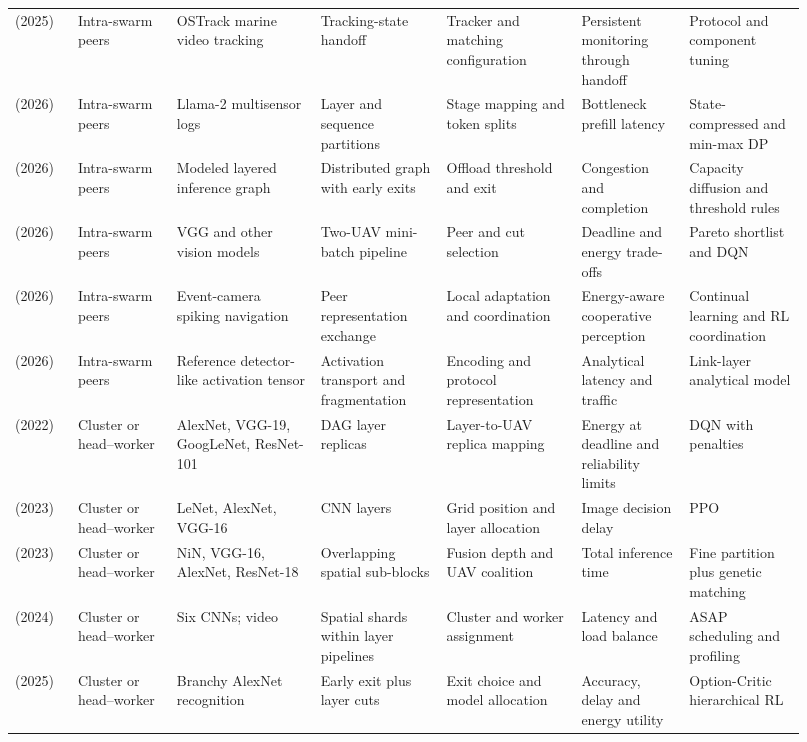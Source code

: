 \begin{longtable}{@{}Y{0.075\linewidth}Y{0.111\linewidth}Y{0.169\linewidth}Y{0.145\linewidth}Y{0.151\linewidth}Y{0.125\linewidth}Y{0.139\linewidth}@{}}
\cite{R0292} (2025) & Intra-swarm peers & OSTrack marine video tracking & Tracking-state handoff & Tracker and matching configuration & Persistent monitoring through handoff & Protocol and component tuning \\
\cite{R0074} (2026) & Intra-swarm peers & Llama-2 multisensor logs & Layer and sequence partitions & Stage mapping and token splits & Bottleneck prefill latency & State-compressed and min-max DP \\
\cite{R0077} (2026) & Intra-swarm peers & Modeled layered inference graph & Distributed graph with early exits & Offload threshold and exit & Congestion and completion & Capacity diffusion and threshold rules \\
\cite{R0092} (2026) & Intra-swarm peers & VGG and other vision models & Two-UAV mini-batch pipeline & Peer and cut selection & Deadline and energy trade-offs & Pareto shortlist and DQN \\
\cite{R0113} (2026) & Intra-swarm peers & Event-camera spiking navigation & Peer representation exchange & Local adaptation and coordination & Energy-aware cooperative perception & Continual learning and RL coordination \\
\cite{R0121} (2026) & Intra-swarm peers & Reference detector-like activation tensor & Activation transport and fragmentation & Encoding and protocol representation & Analytical latency and traffic & Link-layer analytical model \\
\cite{R0029} (2022) & Cluster or head--worker & AlexNet, VGG-19, GoogLeNet, ResNet-101 & DAG layer replicas & Layer-to-UAV replica mapping & Energy at deadline and reliability limits & DQN with penalties \\
\cite{R0019} (2023) & Cluster or head--worker & LeNet, AlexNet, VGG-16 & CNN layers & Grid position and layer allocation & Image decision delay & PPO \\
\cite{R0043} (2023) & Cluster or head--worker & NiN, VGG-16, AlexNet, ResNet-18 & Overlapping spatial sub-blocks & Fusion depth and UAV coalition & Total inference time & Fine partition plus genetic matching \\
\cite{R0014} (2024) & Cluster or head--worker & Six CNNs; video & Spatial shards within layer pipelines & Cluster and worker assignment & Latency and load balance & ASAP scheduling and profiling \\
\cite{R0022} (2025) & Cluster or head--worker & Branchy AlexNet recognition & Early exit plus layer cuts & Exit choice and model allocation & Accuracy, delay and energy utility & Option-Critic hierarchical RL \\

\end{longtable}
